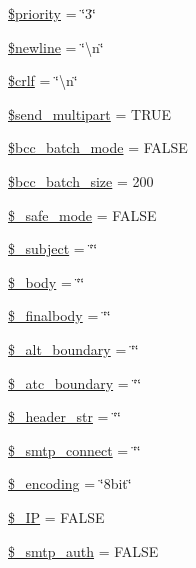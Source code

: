 \begin{DoxyCompactItemize}
\item 
\hyperlink{class_c_i___email_a2677e505e860db863720ac4e216fd3f2}{\$priority} = \char`\"{}3\char`\"{}
\item 
\hyperlink{class_c_i___email_a8735d5c31c4af1004825e6a28f236aeb}{\$newline} = \char`\"{}\textbackslash{}n\char`\"{}
\item 
\hyperlink{class_c_i___email_a85554ab78e9a915b4299dd3f1d5c2866}{\$crlf} = \char`\"{}\textbackslash{}n\char`\"{}
\item 
\hyperlink{class_c_i___email_ad646213e73754a396d49eacaa7fc8218}{\$send\-\_\-multipart} = T\-R\-U\-E
\item 
\hyperlink{class_c_i___email_ac67d3df67b03960980abe368f03e088e}{\$bcc\-\_\-batch\-\_\-mode} = F\-A\-L\-S\-E
\item 
\hyperlink{class_c_i___email_abdb56da29fb9feee14d2374170c3cb5c}{\$bcc\-\_\-batch\-\_\-size} = 200
\item 
\hyperlink{class_c_i___email_a9f2bbbf11ed324c1744f64d81242e8d5}{\$\-\_\-safe\-\_\-mode} = F\-A\-L\-S\-E
\item 
\hyperlink{class_c_i___email_a3a212566602bb9c1c34e7619390b1bb8}{\$\-\_\-subject} = \char`\"{}\char`\"{}
\item 
\hyperlink{class_c_i___email_a2428d6733045fa7c07e5f61c8c85b8c9}{\$\-\_\-body} = \char`\"{}\char`\"{}
\item 
\hyperlink{class_c_i___email_afe3b263ee6d58805f3c06ef1fdc863a5}{\$\-\_\-finalbody} = \char`\"{}\char`\"{}
\item 
\hyperlink{class_c_i___email_a477272b452ccbf6729c9c804cd35b902}{\$\-\_\-alt\-\_\-boundary} = \char`\"{}\char`\"{}
\item 
\hyperlink{class_c_i___email_a643faf39316959087e82595b6355f0a0}{\$\-\_\-atc\-\_\-boundary} = \char`\"{}\char`\"{}
\item 
\hyperlink{class_c_i___email_a551b64b005666b98b001ed7ff405047c}{\$\-\_\-header\-\_\-str} = \char`\"{}\char`\"{}
\item 
\hyperlink{class_c_i___email_ab15af26ecd0970be1fb7609d06eec5ba}{\$\-\_\-smtp\-\_\-connect} = \char`\"{}\char`\"{}
\item 
\hyperlink{class_c_i___email_a37d569dfb47810a72ca1cfc5095ad149}{\$\-\_\-encoding} = \char`\"{}8bit\char`\"{}
\item 
\hyperlink{class_c_i___email_ab476361e2d82b932d0ab83d516741b37}{\$\-\_\-\-I\-P} = F\-A\-L\-S\-E
\item 
\hyperlink{class_c_i___email_a9b977d5970ceedb6cba44032a9976459}{\$\-\_\-smtp\-\_\-auth} = F\-A\-L\-S\-E

\end{DoxyCompactItemize}
